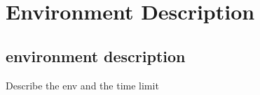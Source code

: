 \chapter{Environment Description}
\label{cha:env_description}
\lipsum \autocite{DBLP:books/sp/HarderR01}



\section{environment description}
Describe the env and the time limit
\label{time_limit}
